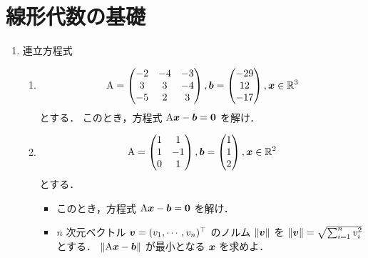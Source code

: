 \section{線形代数の基礎}

\begin{enumerate}[label=問\arabic*.]
  \vspace{2mm}
  \item 連立方程式 \label{linalg:linear_system}

  \vspace{1mm}
  \begin{enumerate}[label=(\roman*)]
    \item
    \begin{equation}
      \mathrm{A} =
        \begin{pmatrix}
          -2 & -4 & -3 \\
           3 &  3 & -4 \\
          -5 &  2 &  3
        \end{pmatrix},
      \boldsymbol{b} =
        \begin{pmatrix}
          -29 \\
           12 \\
          -17
        \end{pmatrix},
      \boldsymbol{x} \in \mathbb{R}^3
    \end{equation}
    とする．
    このとき，方程式 $\mathrm{A} \boldsymbol{x} - \boldsymbol{b} = \boldsymbol{0}$ を解け．
    
    \item
    \begin{equation}
      \mathrm{A} =
        \begin{pmatrix}
           1 & 1 \\ 1 & -1 \\ 0 & 1
        \end{pmatrix},
      \boldsymbol{b} =
        \begin{pmatrix}
           1 \\
           1 \\
           2
        \end{pmatrix},
      \boldsymbol{x} \in \mathbb{R}^2
    \end{equation}
    とする．
    \begin{itemize}
      \item このとき，方程式 $\mathrm{A} \boldsymbol{x} - \boldsymbol{b} = \boldsymbol{0}$ を解け．
      \item $n$ 次元ベクトル $\boldsymbol{v} = (v_1, \cdots, v_n)^\top$ のノルム $\| \boldsymbol{v} \|$ を
        $\| \boldsymbol{v} \| = \sqrt{\sum_{i=1}^n v_i^2}$ とする．
        $\|\mathrm{A} \boldsymbol{x} - \boldsymbol{b} \|$ が最小となる $\boldsymbol{x}$ を求めよ．
    \end{itemize}
    

\end{enumerate}
\end{enumerate}
